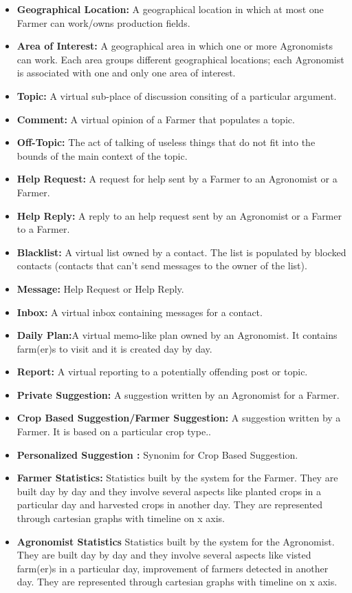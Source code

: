 \begin{itemize}
			\item \textbf{Geographical Location:} A geographical location in which at most one Farmer can work/owns production fields.
			\item \textbf{Area of Interest:} A geographical area in which one or more Agronomists can work. Each area groups different geographical locations; each Agronomist is associated with one and only one area of interest.
			\item \textbf{Topic:} A virtual sub-place of discussion consiting of a particular argument.
			\item \textbf{Comment:} A virtual opinion of a Farmer that populates a topic.
			\item \textbf{Off-Topic:} The act of talking of useless things that do not fit into the bounds of the main context of the topic.
			\item \textbf{Help Request:} A request for help sent by a Farmer to an Agronomist or a Farmer.
			\item \textbf{Help Reply:} A reply to an help request sent by an Agronomist or a Farmer to a Farmer.
			\item \textbf{Blacklist:} A virtual list owned by a contact. The list is populated by blocked contacts (contacts that can't send messages to the owner of the list).
		    \item \textbf{Message:} Help Request or Help Reply.
			\item \textbf{Inbox:} A virtual inbox containing messages for a contact.
			\item \textbf{Daily Plan:}A virtual memo-like plan owned by an Agronomist. It contains farm(er)s to visit and it is created day by day.
		    \item \textbf{Report:} A virtual reporting to a potentially offending post or topic. 
		    \item \textbf{Private Suggestion:} A suggestion written by an Agronomist for a Farmer.
		    \item \textbf{Crop Based Suggestion/Farmer Suggestion:} A suggestion written by a Farmer. It is based on a particular crop type..
		    \item \textbf{Personalized Suggestion :} Synonim for Crop Based Suggestion.
	   	    \item \textbf{Farmer Statistics:} Statistics built by the system for the Farmer. They are built day by day and they involve several aspects like planted crops in a particular day and harvested crops in another day. They are represented through cartesian graphs with timeline on x axis.
	   	    \item \textbf{Agronomist Statistics} Statistics built by the system for the Agronomist. They are built day by day and they involve several aspects like visted farm(er)s in a particular day, improvement of farmers detected in another day. They are represented through cartesian graphs with timeline on x axis.	    
		\end{itemize}
	

